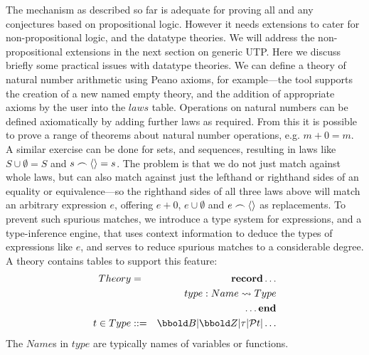The mechanism as described so far is adequate for proving all and any conjectures
based on propositional logic.
However it needs extensions to cater for non-propositional logic,
and the datatype theories.
We will address the non-propositional extensions in the next section
on generic UTP.
Here we discuss briefly some practical issues with datatype theories.
We can define a theory of natural number arithmetic using Peano axioms,
for example---the tool supports the creation of a new named empty
theory, and the addition of appropriate axioms%
 by the user into the $laws$ table.
Operations on natural numbers can be defined axiomatically by adding further
laws as required.
From this it is possible to prove a range of theorems about natural number
operations, e.g. $m + 0 = m$.
A similar exercise can be done for sets, and sequences,
resulting in laws like $S \cup \emptyset = S$ and $s \frown \langle \rangle = s$.
The problem is that we do not just match against whole laws, but can also
match against just the lefthand or righthand sides of an equality or
equivalence---so the righthand sides of all three laws above will match
an arbitrary expression $e$, offering $e+0$, $e \cup \emptyset$ and $e \frown \langle \rangle$
as replacements.
To prevent such spurious matches, we introduce a type system for expressions,
and a type-inference engine, that uses context information to deduce the types
of expressions like $e$, and serves to reduce spurious matches to a considerable degree.
A theory contains tables to support this feature:
\begin{eqnarray*}
Theory &=& \textbf{record} \ldots
\\ && type : Name \pfun Type
\\ && \ldots \textbf{end}
\\ t \in Type &::=& \Bool | \Int | \tau | \power t | \ldots
\end{eqnarray*}
The $Name$s in $type$ are typically names of variables or functions.
